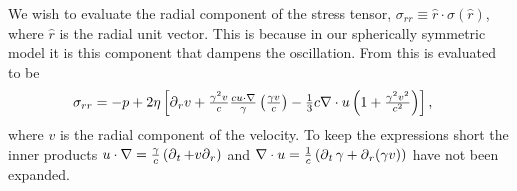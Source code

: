 We wish to evaluate the radial component of the stress tensor, $\sigma_{rr} \equiv \hat r \cdot \sigma(\hat r)$, where $\hat r$ is the radial unit vector.
This is because in our spherically symmetric model it is this component that dampens the oscillation.
From  this is evaluated to be 
\begin{align}
  \sigma_{rr}  &= -p + 2\eta \left[ {\operatorname{\partial}_r} v + \tfrac{\gamma^2 v}{c} \tfrac{c u\cdot \nabla }{\gamma}\left( \tfrac{\gamma v}{c} \right) - \tfrac{1}{3} c\nabla\cdot u\left( 1 + \tfrac{\gamma^2v^2}{c^2} \right) \right], \label{eqn:sigmarr1}
\end{align}
where $v$ is the radial component of the velocity.
To keep the expressions short  the inner products $ u\cdot \nabla = \frac{\gamma }{c} \left( \operatorname{\partial}_t + v {\operatorname{\partial}_r} \right)$ and $\nabla\cdot u = \frac{1}{c}\left( \operatorname{\partial}_t\gamma + {\operatorname{\partial}_r}(\gamma v) \right)$ have not been expanded.

